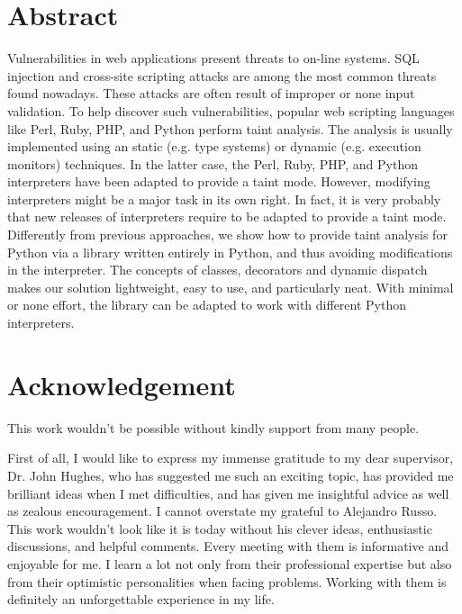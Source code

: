 \documentclass[a4paper]{report}
\begin{document}
\chapter*{Abstract}


Vulnerabilities in web applications present threats to on-line systems.
SQL injection and cross-site scripting attacks are among the
most common threats found nowadays. These attacks are
often result of improper or none input validation. 
To help discover such vulnerabilities, 
popular web scripting 
languages like Perl, Ruby, PHP, 
and Python perform taint analysis.
The analysis is usually implemented using an static (e.g. type
systems) or dynamic (e.g. execution monitors) techniques. 
In the latter case, the Perl, Ruby, PHP, and Python interpreters have
been adapted to provide a taint mode. 
However, modifying interpreters might be a major task in its own
right. In fact, it is very probably that  
new releases of interpreters require to 
be adapted to provide a taint mode.
Differently from previous approaches, 
we show how to provide taint analysis for Python via a library
 written entirely in Python, and thus avoiding modifications in the interpreter.
The concepts of classes, decorators and dynamic dispatch
makes our solution lightweight, easy to use, and particularly neat.
With minimal or none effort, the library can be adapted
to work with different Python interpreters.



\chapter*{Acknowledgement}

This work wouldn't be possible without kindly support from many people.

First of all, I would like to express my immense gratitude to my dear supervisor, 
Dr. John Hughes, who has suggested me such an exciting topic, has provided me brilliant ideas
when I met difficulties, and has given me insightful advice as well as zealous encouragement.
I cannot overstate my grateful to Alejandro Russo. This work wouldn't look like it is today
without his clever ideas, enthusiastic discussions, and helpful comments.
Every meeting with them is informative and enjoyable for me.  
I learn a lot not only from their professional expertise but also from their optimistic personalities
when facing problems.
Working with them is definitely an unforgettable experience in my life.
\end{document}
